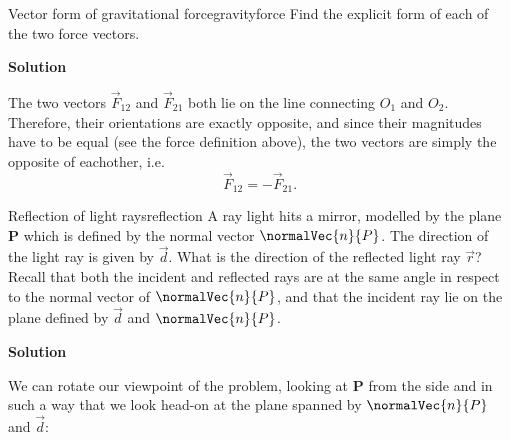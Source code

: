 \begin{example}{Vector form of gravitational force}{gravityforce}
  \flushleft
  Find the explicit form of each of the two force vectors.

  \vspace{1em}
  \textbf{Solution}

  The two vectors $\vec{F}_{12}$ and $\vec{F}_{21}$ both lie on the line connecting $O_{1}$ and $O_{2}$. Therefore, their orientations are exactly opposite, and since their magnitudes have to be equal (see the force definition above), the two vectors are simply the opposite of eachother, i.e.
  \[
    \vec{F}_{12} = -\vec{F}_{21}.
  \]
\end{example}

\begin{example}{Reflection of light rays}{reflection}
	A ray light hits a mirror, modelled by the plane $\mathbf{P}$ which is defined by the normal vector $\normalVec{n}{P}$. The direction of the light ray is given by $\vec{d}$. What is the direction of the reflected light ray $\vec{r}$? Recall that both the incident and reflected rays are at the same angle in respect to the normal vector of $\normalVec{n}{P}$, and that the incident ray lie on the plane defined by $\vec{d}$ and $\normalVec{n}{P}$.

\centering
{}

\flushleft

\textbf{Solution}

We can rotate our viewpoint of the problem, looking at $\mathbf{P}$ from the side and in such a way that we look head-on at the plane spanned by $\normalVec{n}{P}$ and $\vec{d}$:


\end{example}
